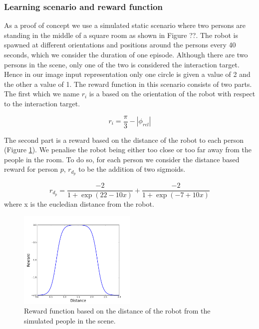 \documentclass[a4paper,11pt]{report}
\begin{document}
\subsubsection{Learning scenario and reward function}

As a proof of concept we use a simulated static scenario where two persons are standing in the middle of a square room as shown in Figure ??. The robot is spawned at different orientations and positions around the persons every 40 seconds, which we consider the duration of one episode. Although there are two persons in the scene, only one of the two is considered the interaction target. Hence in our image input representation only one circle is given a value of 2 and the other a value of 1. The reward function in this scenario consists of two parts. The first which we name $r_i$ is a based on the orientation of the robot with respect to the interaction target. 

\begin{equation}
	r_i = \frac{\pi}{3} -|\phi_{rel}| 
\end{equation}

The second part is a reward based on the distance of the robot to each person (Figure \ref{fig:rd}). We penalise the robot being either too close or too far away from the people in the room. To do so, for each person we consider the distance based reward for person $p$, $r_{d_p}$ to be the addition of two sigmoids.

\begin{equation}
	r_{d_p} = \frac{-2}{1+\exp(22-10x)}+ \frac{-2}{1+\exp(-7+10x)} 
\end{equation}
where x is the eucledian distance from the robot.

	\begin{figure}
	\centering
	    \includegraphics[width=0.5\textwidth]{figures/rd.png}
	  \caption[Distance based reward function]{Reward function based on the distance of the robot from the simulated people in the scene.}
	  \label{fig:rd}
	\end{figure}
	
\end{document}
